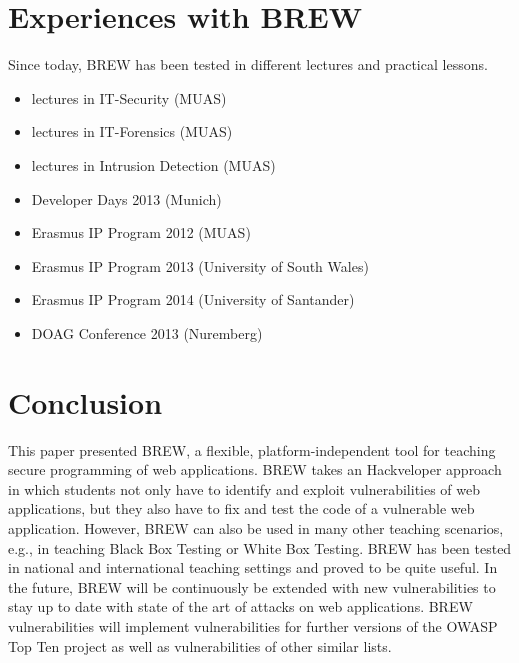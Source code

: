 \documentclass{llncs}
\begin{document}
\section{Experiences with BREW}\label{sec:exp}
Since today, BREW has been tested in different lectures and practical lessons.
\begin{itemize}
\item lectures in IT-Security (MUAS)
\item lectures in IT-Forensics (MUAS)
\item lectures in Intrusion Detection (MUAS)
\item Developer Days 2013 (Munich)
\item Erasmus IP Program 2012 (MUAS)
\item Erasmus IP Program 2013 (University of South Wales)
\item Erasmus IP Program 2014 (University of Santander)
\item DOAG Conference 2013 (Nuremberg)
\end{itemize}



\section{Conclusion}\label{sec:conclusion}
This paper presented BREW, a flexible, platform-independent tool for teaching secure programming of web applications. BREW takes an Hackveloper approach in which students not only have to identify and exploit vulnerabilities of web applications, but they also have to fix and test the code of a vulnerable web application. However, BREW can also be used in many other teaching scenarios, e.g., in teaching Black Box Testing or White Box Testing. BREW has been tested in national and international teaching settings and proved to be quite useful. 
In the future, BREW will be continuously be extended with new vulnerabilities to stay up to date with state of the art of attacks on web applications. BREW vulnerabilities will implement vulnerabilities for further versions of the OWASP Top Ten project as well as vulnerabilities of other similar lists. 




\end{document}
